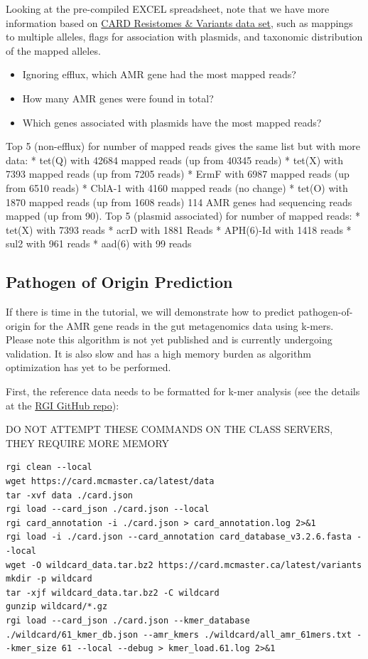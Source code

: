 \documentclass[
]{book}
\providecommand{\tightlist}{%
  \setlength{\itemsep}{0pt}\setlength{\parskip}{0pt}}
\begin{document}
Looking at the pre-compiled EXCEL spreadsheet, note that we have more information based on \href{https://card.mcmaster.ca/resistomes}{CARD Resistomes \& Variants data set}, such as mappings to multiple alleles, flags for association with plasmids, and taxonomic distribution of the mapped alleles.

\begin{itemize}
\tightlist
\item
  Ignoring efflux, which AMR gene had the most mapped reads?
\item
  How many AMR genes were found in total?
\item
  Which genes associated with plasmids have the most mapped reads?
\end{itemize}

Top 5 (non-efflux) for number of mapped reads gives the same list but with more data: * tet(Q) with 42684 mapped reads (up from 40345 reads) * tet(X) with 7393 mapped reads (up from 7205 reads) * ErmF with 6987 mapped reads (up from 6510 reads) * CblA-1 with 4160 mapped reads (no change) * tet(O) with 1870 mapped reads (up from 1608 reads) 114 AMR genes had sequencing reads mapped (up from 90). Top 5 (plasmid associated) for number of mapped reads: * tet(X) with 7393 reads * acrD with 1881 Reads * APH(6)-Id with 1418 reads * sul2 with 961 reads * aad(6) with 99 reads

\subsection{Pathogen of Origin Prediction}\label{pathogen-of-origin-prediction}

If there is time in the tutorial, we will demonstrate how to predict pathogen-of-origin for the AMR gene reads in the gut metagenomics data using k-mers. Please note this algorithm is not yet published and is currently undergoing validation. It is also slow and has a high memory burden as algorithm optimization has yet to be performed.

First, the reference data needs to be formatted for k-mer analysis (see the details at the \href{https://github.com/arpcard/rgi\#using-rgi-kmer-query-k-mer-taxonomic-classification}{RGI GitHub repo}):

DO NOT ATTEMPT THESE COMMANDS ON THE CLASS SERVERS, THEY REQUIRE MORE MEMORY

\begin{verbatim}
rgi clean --local       
wget https://card.mcmaster.ca/latest/data
tar -xvf data ./card.json
rgi load --card_json ./card.json --local
rgi card_annotation -i ./card.json > card_annotation.log 2>&1       
rgi load -i ./card.json --card_annotation card_database_v3.2.6.fasta --local
wget -O wildcard_data.tar.bz2 https://card.mcmaster.ca/latest/variants
mkdir -p wildcard
tar -xjf wildcard_data.tar.bz2 -C wildcard
gunzip wildcard/*.gz
rgi load --card_json ./card.json --kmer_database ./wildcard/61_kmer_db.json --amr_kmers ./wildcard/all_amr_61mers.txt --kmer_size 61 --local --debug > kmer_load.61.log 2>&1
\end{verbatim}
\end{document}
